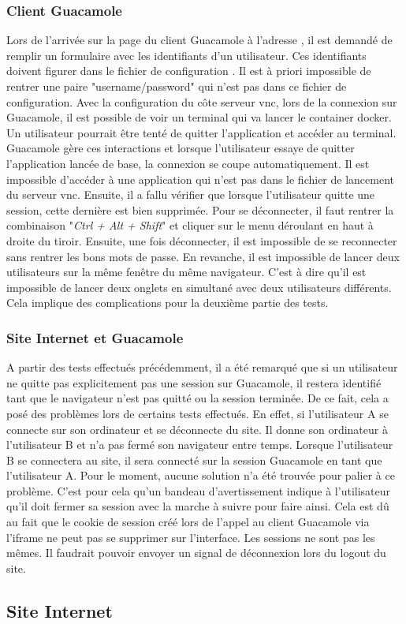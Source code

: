 \subsubsection{Client Guacamole}
Lors de l'arrivée sur la page du client Guacamole à l'adresse , il est demandé de remplir un formulaire avec les identifiants d'un utilisateur.
Ces identifiants doivent figurer dans le fichier de configuration .
Il est à priori impossible de rentrer une paire "username/password" qui n'est pas dans ce fichier de configuration.
\newline
Avec la configuration du côte serveur \acrshort{vnc}, lors de la connexion sur Guacamole, il est possible de voir un terminal qui va lancer le container docker.
Un utilisateur pourrait être tenté de quitter l'application et accéder au terminal.
Guacamole gère ces interactions et lorsque l'utilisateur essaye de quitter l'application lancée de base, la connexion se coupe automatiquement.
Il est impossible d'accéder à une application qui n'est pas dans le fichier de lancement du serveur \acrshort{vnc}.
\newline
Ensuite, il a fallu vérifier que lorsque l'utilisateur quitte une session, cette dernière est bien supprimée.
Pour se déconnecter, il faut rentrer la combinaison "\textit{Ctrl + Alt + Shift}" et cliquer sur le menu déroulant en haut à droite du tiroir.
Ensuite, une fois déconnecter, il est impossible de se reconnecter sans rentrer les bons mots de passe.
\newline
En revanche, il est impossible de lancer deux utilisateurs sur la même fenêtre du même navigateur.
C'est à dire qu'il est impossible de lancer deux onglets en simultané avec deux utilisateurs différents.
Cela implique des complications pour la deuxième partie des tests.

\subsubsection{Site Internet et Guacamole}
A partir des tests effectués précédemment, il a été remarqué que si un utilisateur ne quitte pas explicitement pas une session sur Guacamole, il restera identifié tant que le navigateur n'est pas quitté ou la session terminée.
De ce fait, cela a posé des problèmes lors de certains tests effectués.
En effet, si l'utilisateur A se connecte sur son ordinateur et se déconnecte du site.
Il donne son ordinateur à l'utilisateur B et n'a pas fermé son navigateur entre temps.
Lorsque l'utilisateur B se connectera au site, il sera connecté sur la session Guacamole en tant que l'utilisateur A.
Pour le moment, aucune solution n'a été trouvée pour palier à ce problème.
C'est pour cela qu'un bandeau d'avertissement indique à l'utilisateur qu'il doit fermer sa session avec la marche à suivre pour faire ainsi.
Cela est dû au fait que le cookie de session créé lors de l'appel au client Guacamole via l'iframe ne peut pas se supprimer sur l'interface.
Les sessions ne sont pas les mêmes.
Il faudrait pouvoir envoyer un signal de déconnexion lors du logout du site.

\subsection{Site Internet}



